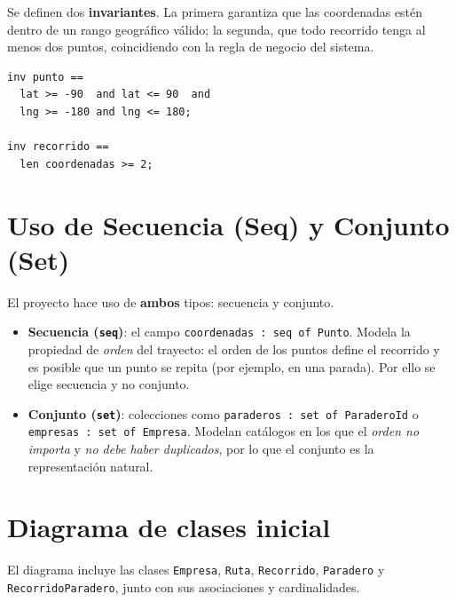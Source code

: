 \documentclass[11pt,a4paper]{article}
\begin{document}
Se definen dos \textbf{invariantes}. La primera garantiza que las coordenadas estén dentro de un rango geográfico válido; la segunda, que todo recorrido tenga al menos dos puntos, coincidiendo con la regla de negocio del sistema.

\begin{lstlisting}
inv punto ==
  lat >= -90  and lat <= 90  and
  lng >= -180 and lng <= 180;

inv recorrido ==
  len coordenadas >= 2;
\end{lstlisting}

\section{Uso de Secuencia (Seq) y Conjunto (Set)}

El proyecto hace uso de \textbf{ambos} tipos: secuencia y conjunto.

\begin{itemize}
  \item \textbf{Secuencia (\texttt{seq})}: el campo \texttt{coordenadas : seq of Punto}. Modela la propiedad de \emph{orden} del trayecto: el orden de los puntos define el recorrido y es posible que un punto se repita (por ejemplo, en una parada). Por ello se elige secuencia y no conjunto.
  \item \textbf{Conjunto (\texttt{set})}: colecciones como \texttt{paraderos : set of ParaderoId} o \texttt{empresas : set of Empresa}. Modelan catálogos en los que el \emph{orden no importa} y \emph{no debe haber duplicados}, por lo que el conjunto es la representación natural.
\end{itemize}

\section{Diagrama de clases inicial}

El diagrama incluye las clases \texttt{Empresa}, \texttt{Ruta}, \texttt{Recorrido}, \texttt{Paradero} y \texttt{RecorridoParadero}, junto con sus asociaciones y cardinalidades.
\end{document}
